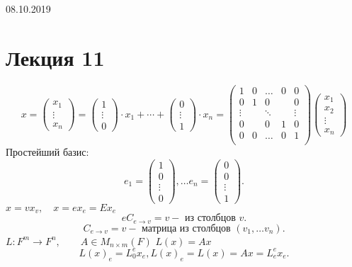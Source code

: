 \documentclass[11pt]{book}
\theoremstyle{definition}
\theoremstyle{plain}
\theoremstyle{plain}
\theoremstyle{definition}
\theoremstyle{remark}
\begin{document}
08.10.2019
\section{Лекция 11}
$$
x = 
 \left ( 
\begin{array}{c}
x_1 \\ \vdots \\x_n 
\end{array}
\right )
= \left ( 
\begin{array}{c}
1 \\ \vdots \\ 0
\end{array}
\right )\cdot x_1 + \cdots + \left ( 
\begin{array}{c}
0 \\ \vdots \\ 1
\end{array}
\right ) \cdot x_n = 
\left ( 
\begin{array}{ccccc}
    1 & 0  & \ldots & 0 & 0 \\
    0 & 1  & 0 & & 0\\
    \vdots & & \ddots & & \vdots \\
    0 &  & 0 & 1 & 0\\
    0 & 0  & \ldots & 0 & 1 \\
\end{array}
\right )
\left ( 
\begin{array}{c}
    x_1 \\ x_2 \\ \vdots \\ x_n
\end{array}
\right )
$$
Простейший базис:
\[
e_1 = 
\left ( 
\begin{array}{c}
1 \\ 0 \\ \vdots \\ 0
\end{array}
\right )
, \ldots e_n = \left ( 
\begin{array}{c}
0 \\ 0 \\ \vdots \\ 1
\end{array}
\right )
.\] 
$x = v x_v, \quad x = e x_e = E x_e$\\
 \[
     e C_{e \to v} = v - \mbox{ из столбцов } v
.\] 
\[
    C_{e \to v} = v - \mbox{ матрица из столбцов } (v_1, \ldots v_n)
.\] 
$L: F^m \to F^n , \qquad A \in M_{n \times m}(F)$
$L(x) = A x$\\
 \[
     L(x)_e = L_0^e x_e , L(x)_e = L(x) = Ax = L_e ^e x_e
.\] 
\end{document}
